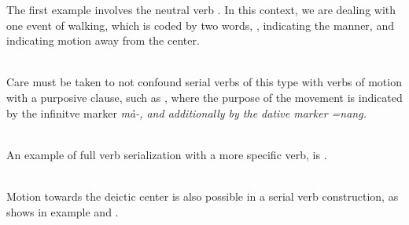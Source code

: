 The first example involves the neutral verb . In this context, we are dealing with one event of walking, which is coded by two words, , indicating the manner, and  indicating motion away from the center. 


\\

Care must be taken to not confound serial verbs of this type with verbs of motion with a purposive clause, such as , where the purpose of the movement is indicated by the infinitve marker \em mà-\em, and additionally by the dative marker \em =nang\em.


 \\

 

An example of full verb serialization with a more specific verb,  is .


 \\  
% 
Motion towards the deictic center is also possible in a serial verb construction, as  shows in example  and .



